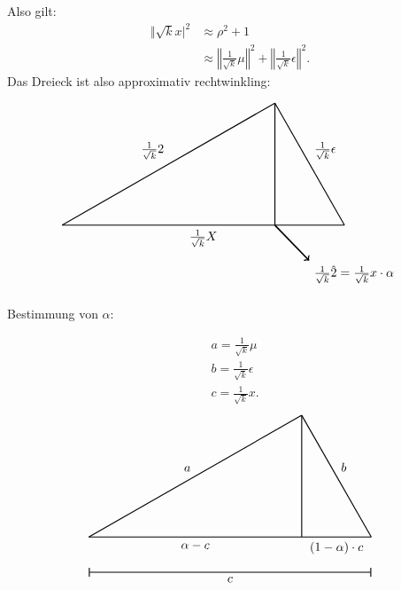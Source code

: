 \documentclass[10pt]{article}
\begin{document}
	Also gilt:
	\begin{equation*}
		\begin{split}
			\Vert \sqrt{k}x\vert^2 &\approx \rho^2+1\\
				&\approx \left\Vert \frac{1}{\sqrt{k}}\mu\right\Vert^2 + \left\Vert \frac{1}{\sqrt{k}} \epsilon \right\Vert^2.
		\end{split}
	\end{equation*}
	Das Dreieck ist also approximativ rechtwinkling: 
	
	\begin{align*}
		\begin{tikzpicture}
			\draw[thick, -] (0,0) -- node[midway, above left] {$\frac{1}{\sqrt{k}}\mu$} (6.029836,3.446703);
			\draw[thick, -] (6.029836,3.446703) -- node[midway, above right] {$\frac{1}{\sqrt{k}}\epsilon$} (8,0);
			\draw[thick, -] (0,0) -- node[midway, below] {$\frac{1}{\sqrt{k}}X$} (8,0);
			\draw[thick, -] (6.029836,0) -- (6.029836,3.446703);
			\draw[very thick, ->] (6.029836,0) -- (7,-1) node[below right] {$\frac{1}{\sqrt{k}} \hat{\mu} = \frac{1}{\sqrt{k}} x \cdot \alpha$};
		\end{tikzpicture}
	\end{align*}	
	
	Bestimmung von $\alpha$:
	
	\begin{equation*}
		\begin{split}
			&a = \frac{1}{\sqrt{k}} \mu\\
			&b = \frac{1}{\sqrt{k}} \epsilon\\
			&c = \frac{1}{\sqrt{k}} x.
		\end{split}
	\end{equation*}
		\begin{align*}
		\begin{tikzpicture}
			\draw[thick, -] (0,0) -- node[midway, above left] {$a$} (6.029836,3.446703);
			\draw[thick, -] (6.029836,3.446703) -- node[midway, above right] {$b$} (8,0);
			\draw[thick, -] (0,0) -- node[midway, below] {$\alpha - c$} (6.029863,0);
			\draw[thick, -] (6.029863,0) -- node[midway, below] {$(1- \alpha) \cdot c$} (8,0);
			\draw[thick, -] (6.029836,0) -- (6.029836,3.446703);
			\draw[thick, |-|] (0,-1) --node[midway, below] {$c$} (8,-1);
		\end{tikzpicture}
	\end{align*}
	
\end{document}
